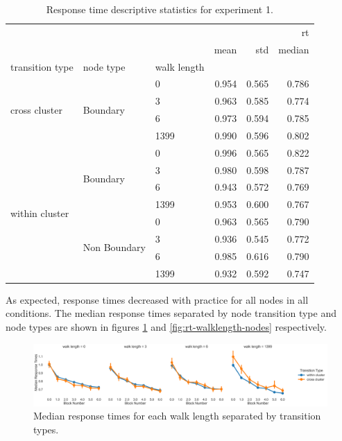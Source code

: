 \begin{table}	
	\centering
	\label{tab:exp1-rt-stats}
	\caption{Response time descriptive statistics for experiment 1.}
	\begin{tabular}{lllrrr}
		\toprule
		 &  &  & \multicolumn{3}{r}{rt} \\
		 &  &  & mean & std & median \\
		transition type & node type & walk length &  &  &  \\
		\midrule
		\multirow[t]{4}{*}{cross cluster} & \multirow[t]{4}{*}{Boundary} & 0 & 0.954 & 0.565 & 0.786 \\
		 &  & 3 & 0.963 & 0.585 & 0.774 \\
		 &  & 6 & 0.973 & 0.594 & 0.785 \\
		 &  & 1399 & 0.990 & 0.596 & 0.802 \\
		\cline{1-6} \cline{2-6}
		\multirow[t]{8}{*}{within cluster} & \multirow[t]{4}{*}{Boundary} & 0 & 0.996 & 0.565 & 0.822 \\
		 &  & 3 & 0.980 & 0.598 & 0.787 \\
		 &  & 6 & 0.943 & 0.572 & 0.769 \\
		 &  & 1399 & 0.953 & 0.600 & 0.767 \\
		\cline{2-6}
		 & \multirow[t]{4}{*}{Non Boundary} & 0 & 0.963 & 0.565 & 0.790 \\
		 &  & 3 & 0.936 & 0.545 & 0.772 \\
		 &  & 6 & 0.985 & 0.616 & 0.790 \\
		 &  & 1399 & 0.932 & 0.592 & 0.747 \\
		\cline{1-6} \cline{2-6}
		\bottomrule
		\end{tabular}
	\end{table}
	

As expected, response times decreased with practice for all nodes in all conditions. The median response times separated by node transition type and node types are shown in figures \ref{fig:rt-walklength-transitions} and \ref{fig:rt-walklength-nodes} respectively. 

\begin{figure}
	\centering
	\label{fig:rt-walklength-transitions}
	\includegraphics[width = \textwidth]{chapter_notebooks/chapter_2/figures/median_rts_transitiontype.png}
	\caption{Median response times for each walk length separated by transition types.}
\end{figure}


